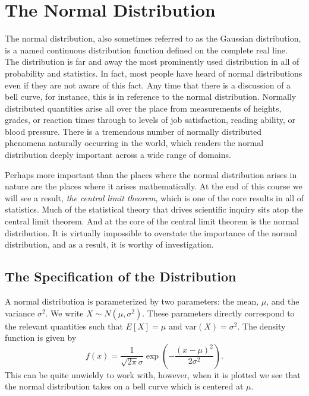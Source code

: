 \documentclass[
  letterpaper,
  DIV=11,
  numbers=noendperiod]{scrreprt}
\theoremstyle{definition}
\theoremstyle{definition}
\theoremstyle{definition}
\theoremstyle{remark}
\begin{document}
\section{The Normal Distribution}\label{the-normal-distribution}

The normal distribution, also sometimes referred to as the Gaussian
distribution, is a named continuous distribution function defined on the
complete real line. The distribution is far and away the most
prominently used distribution in all of probability and statistics. In
fact, most people have heard of normal distributions even if they are
not aware of this fact. Any time that there is a discussion of a bell
curve, for instance, this is in reference to the normal distribution.
Normally distributed quantities arise all over the place from
measurements of heights, grades, or reaction times through to levels of
job satisfaction, reading ability, or blood pressure. There is a
tremendous number of normally distributed phenomena naturally occurring
in the world, which renders the normal distribution deeply important
across a wide range of domains.

Perhaps more important than the places where the normal distribution
arises in nature are the places where it arises mathematically. At the
end of this course we will see a result, \emph{the central limit
theorem}, which is one of the core results in all of statistics. Much of
the statistical theory that drives scientific inquiry sits atop the
central limit theorem. And at the core of the central limit theorem is
the normal distribution. It is virtually impossible to overstate the
importance of the normal distribution, and as a result, it is worthy of
investigation.

\subsection{The Specification of the
Distribution}\label{the-specification-of-the-distribution}

A normal distribution is parameterized by two parameters: the mean,
\(\mu\), and the variance \(\sigma^2\). We write
\(X\sim N(\mu,\sigma^2)\). These parameters directly correspond to the
relevant quantities such that \(E[X] = \mu\) and
\(\text{var}(X) = \sigma^2\). The density function is given by
\[f(x) = \frac{1}{\sqrt{2\pi}\sigma}\exp\left(-\frac{(x-\mu)^2}{2\sigma^2}\right).\]
This can be quite unwieldy to work with, however, when it is plotted we
see that the normal distribution takes on a bell curve which is centered
at \(\mu\).
\end{document}
